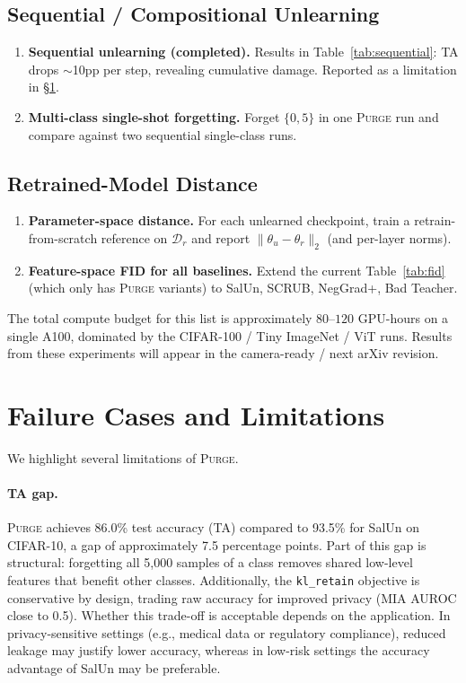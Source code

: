 \documentclass{article}
\newcommand{\ours}{\textsc{Purge}}
\newcommand{\klr}{\texttt{kl\_retain}}
\newcommand{\Dr}{\mathcal{D}_r}
\newcommand{\new}[1]{{\color{orange}#1}}
\begin{document}
{\subsection{Sequential / Compositional Unlearning}
\begin{enumerate}[nosep,leftmargin=*]
\item \new{\textbf{Sequential unlearning (completed).} Results in Table~\ref{tab:sequential}: TA drops $\sim$10pp per step, revealing cumulative damage. Reported as a limitation in \S\ref{sec:limitations}.}
\item \textbf{Multi-class single-shot forgetting.} Forget $\{0, 5\}$ in one \ours{} run and compare against two sequential single-class runs.
\end{enumerate}

\subsection{Retrained-Model Distance}
\begin{enumerate}[nosep,leftmargin=*]
\item \textbf{Parameter-space distance.} For each unlearned checkpoint, train a retrain-from-scratch reference on $\Dr$ and report $\|\theta_u - \theta_r\|_2$ (and per-layer norms).
\item \textbf{Feature-space FID for all baselines.} Extend the current Table~\ref{tab:fid} (which only has \ours{} variants) to SalUn, SCRUB, NegGrad+, Bad Teacher.
\end{enumerate}

The total compute budget for this list is approximately $80$--$120$ GPU-hours on a single A100, dominated by the CIFAR-100 / Tiny ImageNet / ViT runs. Results from these experiments will appear in the camera-ready / next arXiv revision.
}

\section{Failure Cases and Limitations}\label{sec:limitations}

We highlight several limitations of \ours{}.

\paragraph{TA gap.}
\ours{} achieves \new{86.0\%} test accuracy (TA) compared to 93.5\% for SalUn on CIFAR-10, a gap of approximately \new{7.5} percentage points.
Part of this gap is structural: forgetting all 5{,}000 samples of a class removes shared low-level features that benefit other classes.
Additionally, the \klr{} objective is conservative by design, trading raw accuracy for improved privacy (MIA AUROC close to 0.5).
Whether this trade-off is acceptable depends on the application.
In privacy-sensitive settings (e.g., medical data or regulatory compliance), reduced leakage may justify lower accuracy, whereas in low-risk settings the accuracy advantage of SalUn may be preferable.
\end{document}

